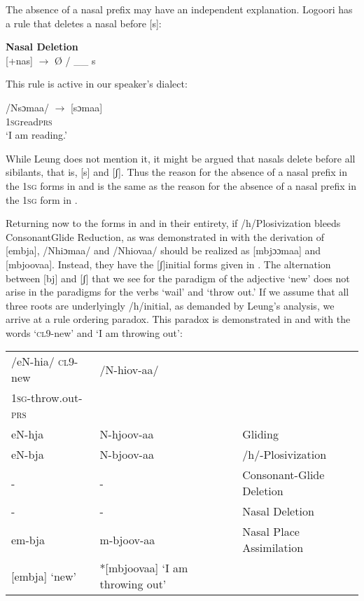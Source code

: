 \documentclass[output=paper]{langsci/langscibook}
\begin{document}
The absence of a nasal prefix may have an independent explanation. Logoori has a rule that deletes a nasal before [s]:



\ea\label{ex:glewwe:20}{}
 \textbf{Nasal Deletion} \citep[116]{Leung1991}\\{}
 [+nas] $\rightarrow$ Ø / \_\_ s\\
\z

This rule is active in our speaker’s dialect:

\ea\label{ex:glewwe:21}{}
 /Nsɔmaa/  $\rightarrow$  [sɔmaa]\\
\textsc{1sg}read\textsc{prs}\\
\glt ‘I am reading.’
\z

While Leung does not mention it, it might be argued that nasals delete before all sibilants, that is, [s] and [ʃ]. Thus the reason for the absence of a nasal prefix in the 1\textsc{sg} forms in  and  is the same as the reason for the absence of a nasal prefix in the 1\textsc{sg} form in . 

Returning now to the forms in  and  in their entirety, if /h/Plosivization bleeds ConsonantGlide Reduction, as was demonstrated in  with the derivation of [embja], /Nhiɔmaa/ and /Nhiovaa/ should be realized as [mbjɔɔmaa] and [mbjoovaa]. Instead, they have the [ʃ]initial forms given in . The alternation between [bj] and [ʃ] that we see for the paradigm of the adjective ‘new’ does not arise in the paradigms for the verbs ‘wail’ and ‘throw out.’ If we assume that all three roots are underlyingly /h/initial, as demanded by Leung’s analysis, we arrive at a rule ordering paradox. This paradox is demonstrated in  and  with the words ‘\textsc{cl}9-new’ and ‘I am throwing out\textsc{’}:

\ea\label{ex:glewwe:22}{}
\begin{tabular}{lll}
 /eN-hia/  \textsc{cl9}-new & /N-hiov-aa/\\
  \textsc{1sg}-throw.out-\textsc{prs} & \\
eN-hja   &   N-hjoov-aa    &    Gliding\\
eN-bja   &   N-bjoov-aa    &    /h/-Plosivization\\
{}-     &   {}-       &   Consonant-Glide Deletion\\
{}-     &   {}-      &    Nasal Deletion\\
em-bja  &    m-bjoov-aa    &    Nasal Place Assimilation\\{}
[embja]  ‘new’  &  *[mbjoovaa]  ‘I am throwing out’\\
\end{tabular}
\z
\end{document}
